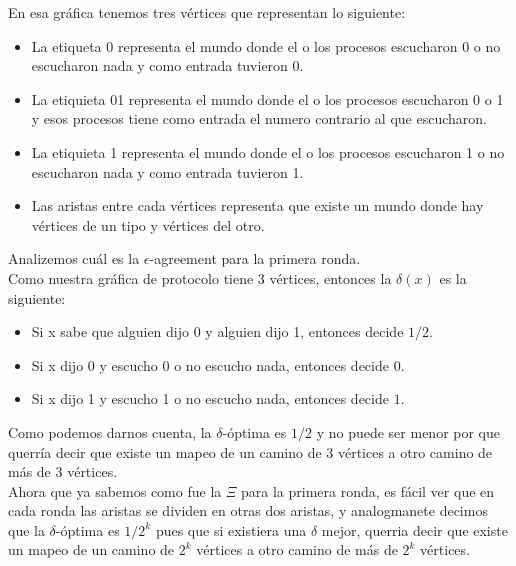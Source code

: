 \documentclass{article}
\begin{document}
\begin{enumerate}
  En esa gráfica tenemos tres vértices que representan lo siguiente:
  
  \begin{itemize}
    
    \item{La etiqueta {0} representa el mundo donde el o los procesos  escucharon 0 
         o no escucharon nada y como entrada tuvieron 0.}
      
    \item{La etiquieta {01} representa el mundo donde el o los procesos  escucharon 0 o 1
        y esos procesos tiene como entrada el numero contrario al que escucharon.}
      
    \item{La etiquieta {1} representa el mundo donde el o los procesos escucharon 1
      o no escucharon nada y como entrada tuvieron 1.}

    \item{Las aristas entre cada vértices representa que existe un mundo donde hay 
      vértices de un tipo y vértices del otro.}
    
  \end{itemize}

  Analizemos cuál es la $\epsilon$-agreement para la primera ronda.\\
  Como nuestra gráfica de protocolo tiene 3 vértices, entonces la $\delta(x)$
  es la siguiente:\\
  
  \begin{itemize}
    
  \item{Si x sabe que alguien dijo 0 y alguien dijo 1, entonces decide $1/2$.}
    
  \item{Si x dijo 0 y escucho 0 o no escucho nada, entonces decide $0$.}
    
  \item{Si x dijo 1 y escucho 1 o no escucho nada, entonces decide $1$.}
    
  \end{itemize}
  
  Como podemos darnos cuenta, la $\delta$-óptima es $1/2$ y no puede ser menor
  por que querría decir que existe un mapeo de un camino de 3 vértices a otro
  camino de más de 3 vértices.\\

  Ahora que ya sabemos como fue la $\Xi$ para la primera ronda, es fácil ver
  que en cada ronda las aristas se dividen en otras dos aristas, y analogmanete
  decimos que la $\delta$-óptima es $1/2^k$ pues que si existiera una $\delta$
  mejor, querria decir que existe un mapeo de un camino de $2^k$ vértices a otro
  camino de más de $2^k$ vértices.\\


\end{enumerate}
\end{document}
